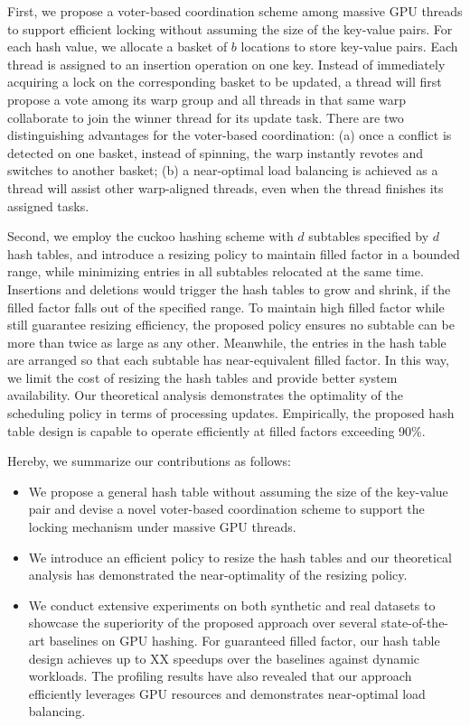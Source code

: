 First, we propose a voter-based coordination scheme among massive GPU threads to support efficient locking without assuming the size of the key-value pairs.
For each hash value, we allocate a basket of $b$ locations to store key-value pairs. 
Each thread is assigned to an insertion operation on one key. Instead of immediately acquiring a lock on the corresponding basket to be updated, a thread will first propose a vote among its warp group and all threads in that same warp collaborate to join the winner thread for its update task. There are two distinguishing advantages for the voter-based coordination: (a) once a conflict is detected on one basket, instead of spinning, the warp instantly revotes and switches to another basket; (b) a near-optimal load balancing is achieved as a thread will assist other warp-aligned threads, even when the thread finishes its assigned tasks.

Second, we employ the cuckoo hashing scheme with $d$ subtables specified by $d$ hash tables, and introduce a resizing policy to maintain filled factor in a bounded range, while minimizing entries in all subtables relocated at the same time. Insertions and deletions would trigger the hash tables to grow and shrink, if the filled factor falls out of the specified range. To maintain high filled factor while still guarantee resizing efficiency, the proposed policy ensures no subtable can be more than twice as large as any other. Meanwhile, the entries in the hash table are arranged so that each subtable has near-equivalent filled factor.
 In this way, we limit the cost of resizing the hash tables and provide better system availability.
Our theoretical analysis demonstrates the optimality of the scheduling policy in terms of processing updates. 
Empirically, the proposed hash table design is capable to operate efficiently at filled factors exceeding 90\%.

Hereby, we summarize our contributions as follows:
\begin{itemize}
	\item We propose a general hash table without assuming the size of the key-value pair and devise a novel voter-based coordination scheme to support the locking mechanism under massive GPU threads. 
	\item We introduce an efficient policy to resize the hash tables and our theoretical analysis has demonstrated the near-optimality of the resizing policy.
	\item We conduct extensive experiments on both synthetic and real datasets to showcase the superiority of the proposed approach over several state-of-the-art baselines on GPU hashing. 
	For guaranteed filled factor, our hash table design achieves up to XX speedups over the baselines against dynamic workloads. The profiling results have also revealed that our approach efficiently leverages GPU resources and demonstrates near-optimal load balancing. 
\end{itemize}

